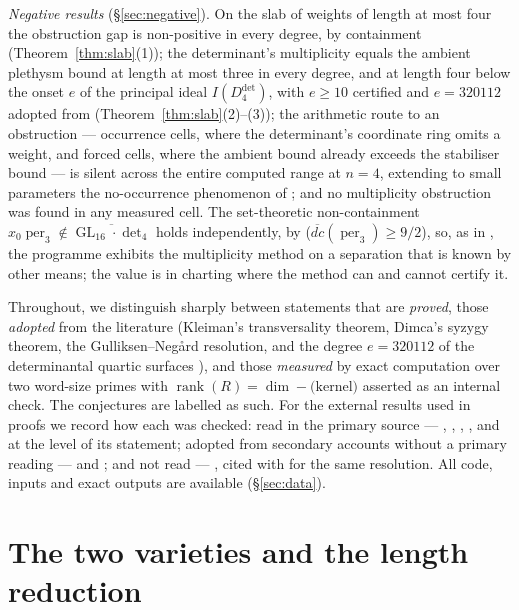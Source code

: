 \documentclass[11pt]{amsart}
\theoremstyle{plain}
\theoremstyle{definition}
\theoremstyle{remark}
\DeclareMathOperator{\GL}{GL}
\DeclareMathOperator{\per}{per}
\DeclareMathOperator{\rank}{rank}
\newcommand{\Ddet}{D^{\det}}
\begin{document}
\emph{Negative results} (\S\ref{sec:negative}).  On the slab of weights of
length at most four the obstruction gap is non-positive in every degree, by
containment (Theorem~\ref{thm:slab}(1)); the determinant's multiplicity equals
the ambient plethysm bound at length at most three in every degree, and at
length four below the onset $e$ of the principal ideal $I(\Ddet_4)$, with
$e\ge10$ certified and $e=320112$ adopted from \cite{LLV}
(Theorem~\ref{thm:slab}(2)--(3)); the arithmetic route to an obstruction --- occurrence
cells, where the determinant's coordinate ring omits a weight, and forced
cells, where the ambient bound already exceeds the stabiliser bound --- is silent
across the entire computed range at $n=4$, extending to small parameters the
no-occurrence phenomenon of \cite{BIP}; and no multiplicity obstruction was
found in any measured cell.  The set-theoretic non-containment
$x_0\per_3\notin\overline{\GL_{16}\cdot\det_4}$ holds independently, by
\cite[Thm.~1.0.1]{LMR} ($\overline{dc}(\per_3)\ge9/2$), so, as in \cite{DIP}, the programme exhibits the
multiplicity method on a separation that is known by other means; the value is
in charting where the method can and cannot certify it.

Throughout, we distinguish sharply between statements that are \emph{proved},
those \emph{adopted} from the literature (Kleiman's transversality theorem,
Dimca's syzygy theorem, the Gulliksen--Neg\aa rd resolution, and the degree
$e=320112$ of the determinantal quartic surfaces \cite{LLV}), and those
\emph{measured} by exact computation over two word-size primes with
$\rank(R)=\dim-\text{(kernel)}$ asserted as an internal check.  The
conjectures are labelled as such.  For the external results used in proofs we
record how each was checked: read in the primary source ---
\cite[(1.9), Cor.~6.4]{Beau}, \cite[Thm.~1.3]{KL2}, \cite[Thms.~1.0.1, 2.3.1,
3.1.1 and \S3.2]{LMR}, \cite[Thm.~2, Lemma~4.2, Table~2, Cor.~3.1]{LLV}, and
\cite[Thm.~3.1]{Dimca13} at the level of its statement; adopted from secondary
accounts without a primary reading --- \cite{Kleiman} and \cite{GN}; and not
read --- \cite{BrunsVetter}, cited with \cite{GN} for the same resolution.  All
code,
inputs and exact outputs are available (\S\ref{sec:data}).

\section{The two varieties and the length reduction}\label{sec:varieties}
\end{document}

